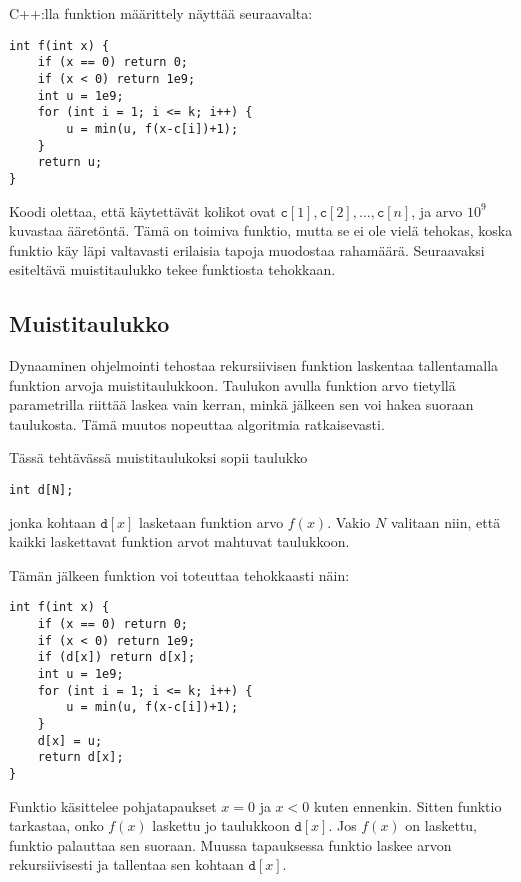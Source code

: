 C++:lla funktion määrittely näyttää seuraavalta:

\begin{lstlisting}
int f(int x) {
    if (x == 0) return 0;
    if (x < 0) return 1e9;
    int u = 1e9;
    for (int i = 1; i <= k; i++) {
        u = min(u, f(x-c[i])+1);
    }
    return u;
}
\end{lstlisting}

Koodi olettaa, että käytettävät kolikot ovat
$\texttt{c}[1], \texttt{c}[2], \ldots, \texttt{c}[n]$,
ja arvo $10^9$ kuvastaa ääretöntä.
Tämä on toimiva funktio, mutta se ei ole vielä tehokas,
koska funktio käy läpi valtavasti erilaisia tapoja
muodostaa rahamäärä.
Seuraavaksi esiteltävä muistitaulukko tekee
funktiosta tehokkaan.

\subsection{Muistitaulukko}

Dynaaminen ohjelmointi tehostaa
rekursiivisen funktion laskentaa
tallentamalla funktion arvoja muistitaulukkoon.
Taulukon avulla funktion arvo
tietyllä parametrilla riittää laskea
vain kerran, minkä jälkeen sen voi
hakea suoraan taulukosta.
Tämä muutos nopeuttaa algoritmia ratkaisevasti.

Tässä tehtävässä muistitaulukoksi sopii taulukko

\begin{lstlisting}
int d[N];
\end{lstlisting}

jonka kohtaan $\texttt{d}[x]$
lasketaan funktion arvo $f(x)$.
Vakio $N$ valitaan niin, että kaikki
laskettavat funktion arvot mahtuvat taulukkoon.

Tämän jälkeen funktion voi toteuttaa
tehokkaasti näin:

\begin{lstlisting}
int f(int x) {
    if (x == 0) return 0;
    if (x < 0) return 1e9;
    if (d[x]) return d[x];
    int u = 1e9;
    for (int i = 1; i <= k; i++) {
        u = min(u, f(x-c[i])+1);
    }
    d[x] = u;
    return d[x];
}
\end{lstlisting}

Funktio käsittelee pohjatapaukset $x=0$
ja $x<0$ kuten ennenkin.
Sitten funktio tarkastaa,
onko $f(x)$ laskettu jo taulukkoon $\texttt{d}[x]$.
Jos $f(x)$ on laskettu,
funktio palauttaa sen suoraan.
Muussa tapauksessa funktio laskee arvon rekursiivisesti
ja tallentaa sen kohtaan $\texttt{d}[x]$.

